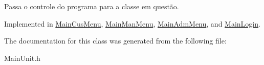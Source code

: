 Passa o controle do programa para a classe em questão. 



Implemented in \hyperlink{classMainCusMenu_a91a3ffa75a1deb30dfc6eb604f1a1a2d}{Main\-Cus\-Menu}, \hyperlink{classMainManMenu_ac864c18863c5f308d0b9c52c223b4b9c}{Main\-Man\-Menu}, \hyperlink{classMainAdmMenu_aa0c46ea4cc61cddfc75e7eb03f549832}{Main\-Adm\-Menu}, and \hyperlink{classMainLogin_ab0149573d015f41f401cfb28aea35509}{Main\-Login}.



The documentation for this class was generated from the following file\-:\begin{DoxyCompactItemize}
\item 
Main\-Unit.\-h\end{DoxyCompactItemize}
